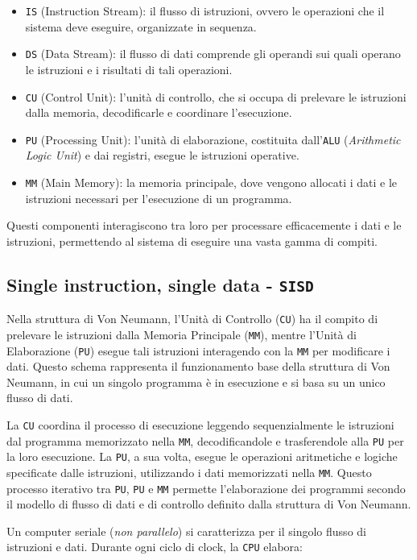 \begin{itemize}
    \item \texttt{IS} (Instruction Stream): il flusso di istruzioni, ovvero le operazioni
    che il sistema deve eseguire, organizzate in sequenza.
    \item \texttt{DS} (Data Stream): il flusso di dati comprende gli operandi sui quali
    operano le istruzioni e i risultati di tali operazioni.
    \item \texttt{CU} (Control Unit): l'unità di controllo, che si occupa di prelevare le
    istruzioni dalla memoria, decodificarle e coordinare l'esecuzione.
    \item \texttt{PU} (Processing Unit): l'unità di elaborazione, costituita dall'\texttt{ALU}
    (\textit{Arithmetic Logic Unit}) e dai registri, esegue le istruzioni operative.
    \item \texttt{MM} (Main Memory): la memoria principale, dove vengono allocati i
    dati e le istruzioni necessari per l'esecuzione di un programma.
\end{itemize}

Questi componenti interagiscono tra loro per processare efficacemente
i dati e le istruzioni, permettendo al sistema di eseguire una vasta
gamma di compiti.
\subsection{Single instruction, single data - \texttt{SISD}}
Nella struttura di Von Neumann, l'Unità di Controllo (\texttt{CU}) ha il
compito di prelevare le istruzioni dalla Memoria Principale (\texttt{MM}), mentre
l'Unità di Elaborazione (\texttt{PU}) esegue tali istruzioni interagendo con la \texttt{MM}
per modificare i dati. Questo schema rappresenta il funzionamento base della
struttura di Von Neumann, in cui un singolo programma è in esecuzione e si basa
su un unico flusso di dati.

La \texttt{CU} coordina il processo di esecuzione leggendo sequenzialmente
le istruzioni dal programma memorizzato nella \texttt{MM}, decodificandole e trasferendole
alla \texttt{PU} per la loro esecuzione. La \texttt{PU}, a sua volta, esegue le operazioni aritmetiche
e logiche specificate dalle istruzioni, utilizzando i dati memorizzati nella \texttt{MM}.
Questo processo iterativo tra \texttt{PU}, \texttt{PU} e \texttt{MM} permette l'elaborazione dei programmi
secondo il modello di flusso di dati e di controllo definito dalla struttura di
Von Neumann.

Un computer seriale (\textit{non parallelo}) si caratterizza per il singolo flusso di
istruzioni e dati. Durante ogni ciclo di clock, la \texttt{CPU} elabora:

